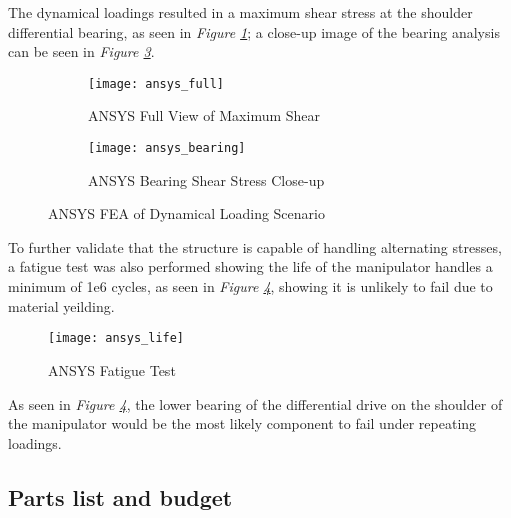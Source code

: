 The dynamical loadings resulted in a maximum shear stress at the shoulder differential bearing, as seen in \emph{Figure \ref{fig:ansys_full}}; a close-up image of the bearing analysis can be seen in \emph{Figure \ref{fig:ansys_bearing}}.

\begin{figure}[htp]
  \center
  \begin{subfigure}[t]{0.5\textwidth}
  \center
  \texttt{[image: ansys\_full]}
  \caption{ANSYS Full View of Maximum Shear}
  \label{fig:ansys_full}
\end{subfigure}%
\begin{subfigure}[t]{0.5\textwidth}
  \center
  \texttt{[image: ansys\_bearing]}
  \caption{ANSYS Bearing Shear Stress Close-up}
  \label{fig:ansys_bearing}
\end{subfigure}
  \caption{ANSYS FEA of Dynamical Loading Scenario}
\end{figure}

To further validate that the structure is capable of handling alternating stresses, a fatigue test was also performed showing the life of the manipulator handles a minimum of 1e6 cycles, as seen in \emph{Figure \ref{fig:ansys_life}}, showing it is unlikely to fail due to material yeilding.

\begin{figure}[htp]
  \center
  \texttt{[image: ansys\_life]}
  \caption{ANSYS Fatigue Test}
  \label{fig:ansys_life}
\end{figure}

As seen in \emph{Figure \ref{fig:ansys_life}}, the lower bearing of the differential drive on the shoulder of the manipulator would be the most likely component to fail under repeating loadings.
\newpage
\subsection*{Parts list and budget}
